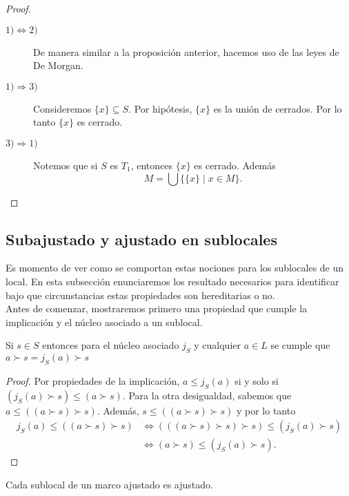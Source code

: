 \documentclass{comunicaciones}
\begin{document}
\begin{proof}
    \begin{description}
        \item[$1)\Leftrightarrow 2)$] De manera similar a la proposición anterior, hacemos uso de las leyes de De Morgan. 
        \item[$1)\Rightarrow 3)$] Consideremos $\{x\}\subseteq S$. Por hipótesis, $\{x\}$ es la unión de cerrados. Por lo tanto $\{x\}$ es cerrado.
        \item[$3)\Rightarrow 1)$] Notemos que si $S$ es $T_1$, entonces $\{x\}$ es cerrado. Además 
        \[
        M=\bigcup\{\{x\}\mid x\in M\}. 
        \]
    \end{description}
\end{proof}

\subsection{Subajustado y ajustado en sublocales}\label{Sajuyaju en Sublocales}

Es momento de ver como se comportan estas nociones para los sublocales de un local. En esta subsección enunciaremos los resultado necesarios para identificar bajo que circunstancias estas propiedades son hereditarias o no.\\

Antes de comenzar, mostraremos primero una propiedad que cumple la implicación y el núcleo asociado a un sublocal. 

\begin{prop}\label{nucleoimplicacion}
    Si $s\in S$ entonces para el núcleo asociado $j_S$ y cualquier $a\in L$ se cumple que $a\succ s=j_S(a)\succ s$
\end{prop}

\begin{proof}
    Por propiedades de la implicación, $a\leq j_S(a)$ si y solo si $(j_S(a)\succ s)\leq (a\succ s)$. Para la otra desigualdad, sabemos que $a\leq ((a\succ s)\succ s)$. Además, $s\leq ((a\succ s)\succ s)$ y por lo tanto  
    \[
    \begin{split}
    j_S(a)\leq ((a\succ s)\succ s) & \Leftrightarrow (((a\succ s)\succ s)\succ s)\leq (j_S(a)\succ s)\\ & \Leftrightarrow (a\succ s)\leq (j_S(a)\succ s).
    \end{split}
    \]
\end{proof}

\begin{prop}\label{aju aju}
    Cada sublocal de un marco ajustado es ajustado.
\end{prop}
\end{document}
